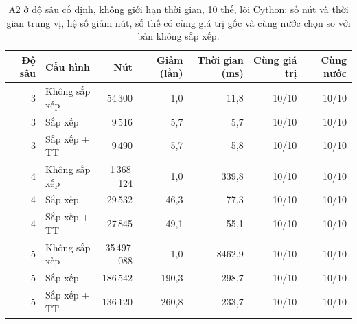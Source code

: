 \begin{table}[H]
  \centering\small
  \caption{A2 ở độ sâu cố định, không giới hạn thời gian, 10 thế, lõi Cython: số nút và thời gian trung vị, hệ số giảm nút, số thế có cùng giá trị gốc và cùng nước chọn so với bản không sắp xếp.}
  \label{tab:a2}
  \setlength{\tabcolsep}{4pt}
  \begin{tabular}{@{}rlrrrrr@{}}
    \toprule
    Độ sâu & Cấu hình & Nút & Giảm (lần) & Thời gian (ms) & Cùng giá trị & Cùng nước \\
    \midrule
    3 & Không sắp xếp & 54\,300 & 1{,}0 & 11{,}8 & 10/10 & 10/10 \\
    3 & Sắp xếp & 9\,516 & 5{,}7 & 5{,}7 & 10/10 & 10/10 \\
    3 & Sắp xếp + TT & 9\,490 & 5{,}7 & 5{,}8 & 10/10 & 10/10 \\
    4 & Không sắp xếp & 1\,368\,124 & 1{,}0 & 339{,}8 & 10/10 & 10/10 \\
    4 & Sắp xếp & 29\,532 & 46{,}3 & 77{,}3 & 10/10 & 10/10 \\
    4 & Sắp xếp + TT & 27\,845 & 49{,}1 & 55{,}1 & 10/10 & 10/10 \\
    5 & Không sắp xếp & 35\,497\,088 & 1{,}0 & 8462{,}9 & 10/10 & 10/10 \\
    5 & Sắp xếp & 186\,542 & 190{,}3 & 298{,}7 & 10/10 & 10/10 \\
    5 & Sắp xếp + TT & 136\,120 & 260{,}8 & 233{,}7 & 10/10 & 10/10 \\
    \bottomrule
  \end{tabular}
\end{table}
